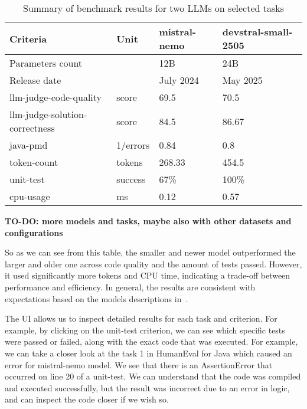 \begin{table}[H]
    \centering
    \begin{tabular}{|l|l|l|l|}
        \hline
        \textbf{Criteria}	& \textbf{Unit} & \textbf{mistral-nemo}	& \textbf{devstral-small-2505} \\
        \hline
        Parameters count    &               & 12B                   & 24B \\
        Release date        &               & July 2024             & May 2025 \\
        \hline
        llm-judge-code-quality & score & 69.5 & 70.5 \\
        llm-judge-solution-correctness & score & 84.5 & 86.67 \\
        java-pmd & 1/errors & 0.84 & 0.8 \\
        token-count & tokens & 268.33 & 454.5 \\
        unit-test & success & 67\% & 100\% \\
        cpu-usage & ms & 0.12 & 0.57 \\
        \hline
    \end{tabular}
    \caption{Summary of benchmark results for two LLMs on selected tasks}
    \label{tab:benchmark-results-summary}
\end{table}

\textbf{TO-DO: more models and tasks, maybe also with other datasets and configurations}

So as we can see from this table, the smaller and newer model outperformed the larger and older one across code quality and the amount of tests passed.
However, it used significantly more tokens and CPU time, indicating a trade-off between performance and efficiency.
In general, the results are consistent with expectations based on the models descriptions in~\cite{mistralModelsBenchmarks}.

The UI allows us to inspect detailed results for each task and criterion.
For example, by clicking on the unit-test criterion, we can see which specific tests were passed or failed, along with the exact code that was executed.
For example, we can take a closer look at the task 1 in HumanEval for Java which caused an error for mistral-nemo model.
We see that there is an AssertionError that occurred on line 20 of a unit-test.
We can understand that the code was compiled and executed successfully, but the result was incorrect due to an error in logic, and can inspect the code closer if we wish so.

